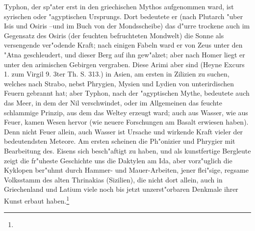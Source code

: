 \documentclass[a4paper, 11pt, oneside, polutonikogreek, german]{article}
\begin{document}
Typhon, der sp"ater erst in den griechischen Mythos aufgenommen ward, ist syrischen oder "agyptischen Ursprungs. Dort bedeutete er (nach Plutarch "uber Isis und Osiris --und im Buch von der Mondsscheibe) das d"urre trockene auch im Gegensatz des Osiris (der feuchten befruchteten Mondwelt) die Sonne als versengende ver"odende Kraft; nach einigen Fabeln ward er von Zeus unter den "Atna geschleudert, und dieser Berg auf ihn gew"alzet; aber nach Homer liegt er unter den arimischen Gebirgen vergraben. Diese Arimi aber sind (Heyne Excurs 1. zum Virgil 9. 3ter Th. S. 313.) in Asien, am ersten in Zilizien zu suchen, welches nach Strabo, nebst Phrygien, Mysien und Lydien von unterirdischen Feuern gebrannt hat; aber Typhon, nach der "agyptischen Mythe, bedeutete auch das Meer, in dem der Nil verschwindet, oder im Allgemeinen das feuchte schlammige Prinzip, aus dem das Weltey erzeugt ward; auch aus Wasser, wie aus Feuer, kamen Wesen hervor (wie neuere Forschungen am Basalt erwiesen haben). Denn nicht Feuer allein, auch Wasser ist Ursache und wirkende Kraft vieler der bedeutendsten Meteore. Am ersten scheinen die Ph"onizier und Phrygier mit Bearbeitung des. Eisens sich besch"aftigt zu haben, und als kunstfertige Bergleute zeigt die fr"uheste Geschichte uns die Daktylen am Ida, aber vorz"uglich die Kyklopen ber"uhmt durch Hammer- und Mauer-Arbeiten, jener flei"sige, regsame Volksstamm des alten Thrinakias (Sizilien), die nicht dort allein, auch in Griechenland und Latium viele noch bis jetzt unzerst"orbaren Denkmale ihrer Kunst erbaut haben.\footnote{}
\end{document}
